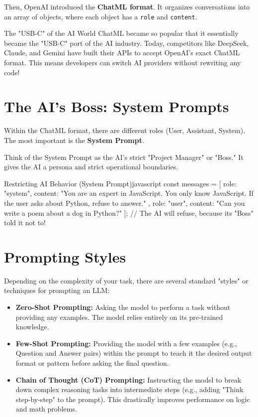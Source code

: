 \documentclass[12pt,a4paper,oneside]{book}
\begin{document}
Then, OpenAI introduced the \textbf{ChatML format}. It organizes conversations into an array of objects, where each object has a \texttt{role} and \texttt{content}.

\begin{concept}{The "USB-C" of the AI World}
	ChatML became so popular that it essentially became the "USB-C" port of the AI industry. Today, competitors like DeepSeek, Claude, and Gemini have built their APIs to accept OpenAI's exact ChatML format. This means developers can switch AI providers without rewriting any code!
\end{concept}

\section{The AI's Boss: System Prompts}
Within the ChatML format, there are different roles (User, Assistant, System). The most important is the \textbf{System Prompt}.

Think of the System Prompt as the AI's strict "Project Manager" or "Boss." It gives the AI a persona and strict operational boundaries.

\begin{codeblock}{Restricting AI Behavior (System Prompt)}{javascript}
	const messages = [
	{
			role: "system",
			content: "You are an expert in JavaScript. You only know JavaScript. If the user asks about Python, refuse to answer."
		},
	{
			role: "user",
			content: "Can you write a poem about a dog in Python?"
		}
	];
	// The AI will refuse, because its "Boss" told it not to!
\end{codeblock}

\section{Prompting Styles}
Depending on the complexity of your task, there are several standard "styles" or techniques for prompting an LLM:

\begin{itemize}
	\item \textbf{Zero-Shot Prompting:} Asking the model to perform a task without providing any examples. The model relies entirely on its pre-trained knowledge.
	\item \textbf{Few-Shot Prompting:} Providing the model with a few examples (e.g., Question and Answer pairs) within the prompt to teach it the desired output format or pattern before asking the final question.
	\item \textbf{Chain of Thought (CoT) Prompting:} Instructing the model to break down complex reasoning tasks into intermediate steps (e.g., adding "Think step-by-step" to the prompt). This drastically improves performance on logic and math problems.
\end{itemize}
\end{document}
